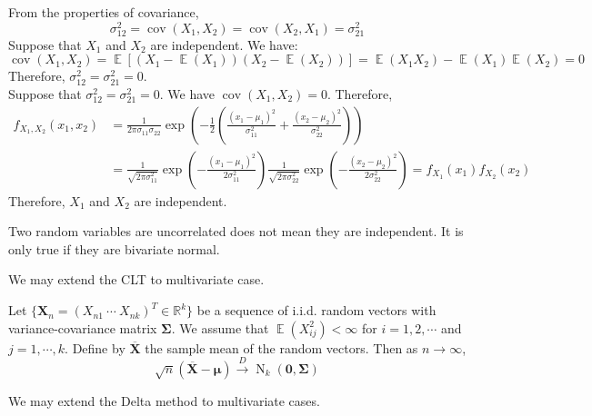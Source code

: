 \documentclass{huhtakm-template-book-v2}
\DeclareMathOperator{\E}{\mathbb{E}}
\DeclareMathOperator{\cov}{cov}
\DeclareMathOperator{\N}{N}
\begin{document}
\begin{proofing}
	From the properties of covariance,
	\begin{equation*}
		\sigma_{12}^{2}=\cov(X_{1},X_{2})=\cov(X_{2},X_{1})=\sigma_{21}^{2}
	\end{equation*}
	Suppose that $X_{1}$ and $X_{2}$ are independent. We have:
	\begin{equation*}
		\cov(X_{1},X_{2})=\E[(X_{1}-\E(X_{1}))(X_{2}-\E(X_{2}))]=\E(X_{1}X_{2})-\E(X_{1})\E(X_{2})=0
	\end{equation*}
	Therefore, $\sigma_{12}^{2}=\sigma_{21}^{2}=0$.\\
	Suppose that $\sigma_{12}^{2}=\sigma_{21}^{2}=0$. We have $\cov(X_{1},X_{2})=0$. Therefore,
	\begin{align*}
		f_{X_{1},X_{2}}(x_{1},x_{2})&=\frac{1}{2\pi\sigma_{11}\sigma_{22}}\exp\left(-\frac{1}{2}\left(\frac{(x_{1}-\mu_{1})^{2}}{\sigma_{11}^{2}}+\frac{(x_{2}-\mu_{2})^{2}}{\sigma_{22}^{2}}\right)\right)\\
		&=\frac{1}{\sqrt{2\pi\sigma_{11}^{2}}}\exp\left(-\frac{(x_{1}-\mu_{1})^{2}}{2\sigma_{11}^{2}}\right)\frac{1}{\sqrt{2\pi\sigma_{22}^{2}}}\exp\left(-\frac{(x_{2}-\mu_{2})^{2}}{2\sigma_{22}^{2}}\right)=f_{X_{1}}(x_{1})f_{X_{2}}(x_{2})
	\end{align*}
	Therefore, $X_{1}$ and $X_{2}$ are independent.
\end{proofing}
\begin{rem}
	Two random variables are uncorrelated does not mean they are independent. It is only true if they are bivariate normal.
\end{rem}
We may extend the CLT to multivariate case.
\begin{thm}
	Let $\{\mathbf{X}_{n}=(X_{n1}\ \cdots\ X_{nk})^{T}\in\mathbb{R}^{k}\}$ be a sequence of i.i.d. random vectors with variance-covariance matrix $\mathbf{\Sigma}$. We assume that $\E(X_{ij}^{2})<\infty$ for $i=1,2,\cdots$ and $j=1,\cdots,k$. Define by $\mathbf{\overline{X}}$ the sample mean of the random vectors. Then as $n\to\infty$,
	\begin{equation*}
		\sqrt{n}(\mathbf{\overline{X}}-\boldsymbol{\mu})\xrightarrow{D}\N_{k}(\mathbf{0},\mathbf{\Sigma})
	\end{equation*}
\end{thm}
We may extend the Delta method to multivariate cases.
\end{document}
